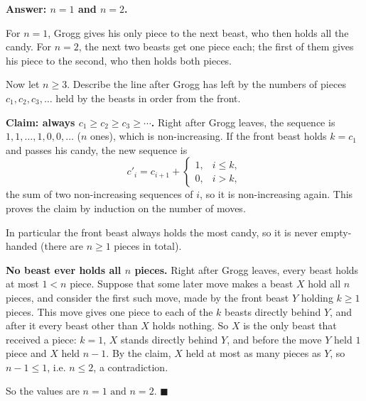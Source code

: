 \textbf{Answer: $n=1$ and $n=2$.}

For $n=1$, Grogg gives his only piece to the next beast, who then holds all the candy. For $n=2$, the next two beasts get one piece each; the first of them gives his piece to the second, who then holds both pieces.

Now let $n\ge3$. Describe the line after Grogg has left by the numbers of pieces $c_1,c_2,c_3,\dots$ held by the beasts in order from the front.

\textbf{Claim: always $c_1\ge c_2\ge c_3\ge\cdots$.} Right after Grogg leaves, the sequence is $1,1,\dots,1,0,0,\dots$ ($n$ ones), which is non-increasing. If the front beast holds $k=c_1$ and passes his candy, the new sequence is
\[c'_i=c_{i+1}+\begin{cases}1,&i\le k,\\0,&i>k,\end{cases}\]
the sum of two non-increasing sequences of $i$, so it is non-increasing again. This proves the claim by induction on the number of moves.

In particular the front beast always holds the most candy, so it is never empty-handed (there are $n\ge1$ pieces in total).

\textbf{No beast ever holds all $n$ pieces.} Right after Grogg leaves, every beast holds at most $1<n$ piece. Suppose that some later move makes a beast $X$ hold all $n$ pieces, and consider the first such move, made by the front beast $Y$ holding $k\ge1$ pieces. This move gives one piece to each of the $k$ beasts directly behind $Y$, and after it every beast other than $X$ holds nothing. So $X$ is the only beast that received a piece: $k=1$, $X$ stands directly behind $Y$, and before the move $Y$ held $1$ piece and $X$ held $n-1$. By the claim, $X$ held at most as many pieces as $Y$, so $n-1\le1$, i.e. $n\le2$, a contradiction.

So the values are $\boxed{n=1\text{ and }n=2}$. $\blacksquare$
